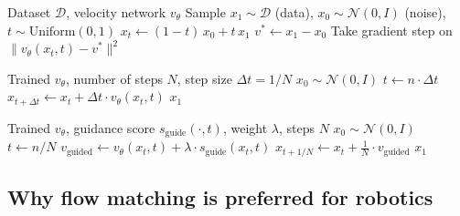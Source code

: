 \documentclass[11pt,letterpaper]{article}
\theoremstyle{plain}
\theoremstyle{definition}
\theoremstyle{remark}
\newcommand{\calN}{\mathcal{N}}
\newcommand{\norm}[1]{\lVert #1\rVert}
\begin{document}
\begin{algorithm}[ht]
\caption{Conditional Flow Matching (CFM) --- Training}\label{alg:cfm-train}
\begin{algorithmic}[1]
\Require Dataset $\mathcal{D}$, velocity network $v_\theta$
\Repeat
  \State Sample $x_1\sim\mathcal{D}$ (data), $x_0\sim\calN(0,I)$ (noise), $t\sim\mathrm{Uniform}(0,1)$
  \State $x_t\gets(1-t)\,x_0+t\,x_1$ 
  \State $v^*\gets x_1-x_0$ 
  \State Take gradient step on $\norm{v_\theta(x_t,t)-v^*}^2$
\end{algorithmic}
\end{algorithm}

\begin{algorithm}[ht]
\caption{Flow Matching --- Sampling (Euler method)}\label{alg:fm-sample}
\begin{algorithmic}[1]
\Require Trained $v_\theta$, number of steps $N$, step size $\Delta t=1/N$
\State $x_0\sim\calN(0,I)$
  \State $t\gets n\cdot\Delta t$
  \State $x_{t+\Delta t}\gets x_t+\Delta t\cdot v_\theta(x_t,t)$ 
\EndFor
\State \Return $x_1$ 
\end{algorithmic}
\end{algorithm}

\begin{algorithm}[ht]
\caption{Guided Flow Matching --- Sampling with Score Correction}\label{alg:guided-fm}
\begin{algorithmic}[1]
\Require Trained $v_\theta$, guidance score $s_\mathrm{guide}(\cdot,t)$, weight $\lambda$, steps $N$
\State $x_0\sim\calN(0,I)$
  \State $t\gets n/N$
  \State $v_\mathrm{guided}\gets v_\theta(x_t,t)+\lambda\cdot s_\mathrm{guide}(x_t,t)$ 
  \State $x_{t+1/N}\gets x_t+\frac{1}{N}\cdot v_\mathrm{guided}$
\EndFor
\State \Return $x_1$
\end{algorithmic}
\end{algorithm}

\subsection{Why flow matching is preferred for robotics}
\end{document}
